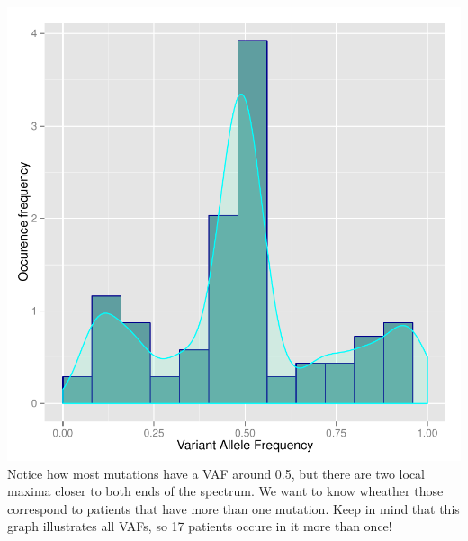 \documentclass[a4paper,11pt]{article}
\begin{document}
\includegraphics{ATM_VAF-006}
\\Notice how most mutations have a VAF around 0.5, but there are two local maxima closer to both ends of the spectrum. We want to know wheather those correspond to patients that have more than one mutation. Keep in mind that this graph illustrates all VAFs, so 17 patients occure in it more than once!\\
\end{document}
